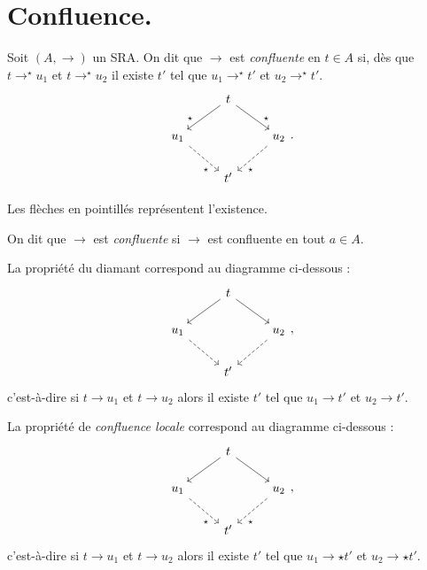 \documentclass[../main]{subfiles}
\begin{document}
  \section{Confluence.}

  \begin{defn}
    Soit $(A, \to)$ un SRA. On dit que $\to$ est \textit{confluente} en $t \in A$ si, dès que $t \to^\star u_1$ et $t \to^\star u_2$ il existe $t'$ tel que $u_1 \to^\star t'$ et $u_2 \to^\star t'$.
    \[
    \begin{tikzcd}
      & t \arrow[near end]{dr}{\star} \arrow[near end,swap]{dl}{\star}\\
      u_1 \arrow[near end,swap,dashed]{dr}{\star} && u_2 \arrow[near end,dashed]{dl}{\star}\\
      & t'
    \end{tikzcd}
    .\]

    Les flèches en pointillés représentent l'existence.

    On dit que $\to$ est \textit{confluente} si $\to $ est confluente en tout $a \in A$.

    La propriété du diamant correspond au diagramme ci-dessous :
    \[
    \begin{tikzcd}
      & t \arrow[near end]{dr}{} \arrow[near end,swap]{dl}{}\\
      u_1 \arrow[near end,swap,dashed]{dr}{} && u_2 \arrow[near end,dashed]{dl}{}\\
      & t'
    \end{tikzcd}
    ,\]
    c'est-à-dire si $t \to u_1$ et $t\to u_2$ alors il existe $t'$ tel que $u_1 \to t'$ et $u_2 \to t'$.

    La propriété de \textit{confluence locale} correspond au diagramme ci-dessous :
    \[
    \begin{tikzcd}
      & t \arrow[near end]{dr}{} \arrow[near end,swap]{dl}{}\\
      u_1 \arrow[near end,swap,dashed]{dr}{\star} && u_2 \arrow[near end,dashed]{dl}{\star}\\
      & t'
    \end{tikzcd}
    ,\]
    c'est-à-dire si $t \to u_1$ et $t\to u_2$ alors il existe $t'$ tel que $u_1 \to\star t'$ et $u_2 \to\star t'$.
  \end{defn}
\end{document}
